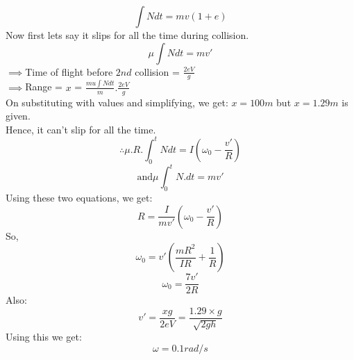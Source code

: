 \documentclass[11pt,a4paper]{scrartcl}
\begin{document}
\begin{solution}
$$\int Ndt = mv(1+e)$$
Now first lets say it slips for all the time during collision.
$$\mu \int Ndt = mv'$$
$\implies$Time of flight before $2nd$ collision = $\frac{2eV}{g}$\\
$\implies$Range = $x$ = $\frac{mu \int Ndt}{m}.\frac{2eV}{g}$\\
On substituting with values and simplifying, we get: $x  = 100m$
but $x=1.29m$ is given.\\
Hence, it can't slip for all the time.
$$\therefore \mu.R.\int_{0}^{t} Ndt = I\left(\omega_0 - \frac{v'}{R}\right)$$
$$ \text{and} \mu \int_{0}^{t}N.dt = mv'$$
Using these two equations, we get:
$$R = \frac{I}{mv'}\left(\omega_0 - \frac{v'}{R}\right)$$
So,
$$\omega_0 = v' \left(\frac{mR^2}{IR}+\frac{1}{R}\right)$$
$$\omega_0 = \frac{7v'}{2R}$$
Also:
$$v' = \frac{xg}{2eV} = \frac{1.29 \times g}{\sqrt{2gh}}$$
Using this we get:
$$\boxed{\omega = 0.1 rad/s}$$


\end{solution}
\vspace{10mm}%
\end{document}
